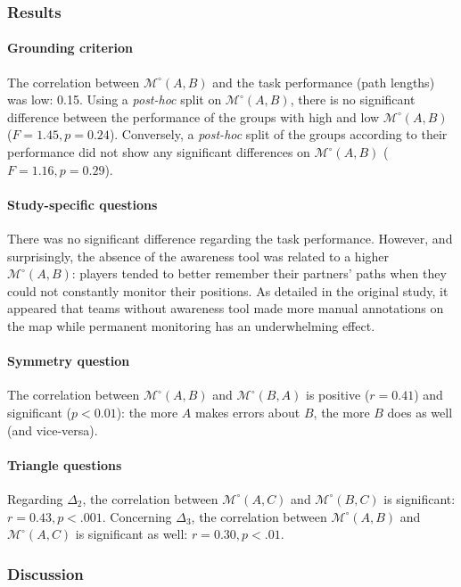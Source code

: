 \documentclass[natbib]{svjour3}
\newcommand{\gModel}[2]{{$\mathcal{M}^{\circ}(#1, #2)$}}
\begin{document}
\subsubsection*{Results}

\paragraph{Grounding criterion} The correlation between \gModel{A}{B} and the
task performance (path lengths) was low: 0.15. Using a \emph{post-hoc} split on
\gModel{A}{B}, there is no significant difference between the performance of the
groups with high and low \gModel{A}{B}  ($F = 1.45, p = 0.24$). Conversely, a
\emph{post-hoc} split of the groups according to their performance did not show
any significant differences on \gModel{A}{B} ($F = 1.16, p = 0.29$).

\paragraph{Study-specific questions} There was no significant difference
regarding the task performance. However, and surprisingly, the absence of the
awareness tool was related to a higher \gModel{A}{B}: players tended to better
remember their partners' paths when they could not constantly monitor their
positions. As detailed in the original study, it
appeared that teams without awareness tool made more manual annotations on the
map while permanent monitoring has an underwhelming effect.

\paragraph{Symmetry question} The correlation between \gModel{A}{B}  and
\gModel{B}{A}  is positive ($r = 0.41$) and significant ($p < 0.01$): the more $A$
makes errors about $B$, the more $B$ does as well (and vice-versa).

\paragraph{Triangle questions} Regarding $\Delta_2$, the correlation between
\gModel{A}{C} and \gModel{B}{C} is significant: $r=0.43, p <.001$. Concerning
$\Delta_3$, the correlation between \gModel{A}{B} and \gModel{A}{C} is
significant as well: $r=0.30, p <.01$.

\subsubsection*{Discussion}
\end{document}
